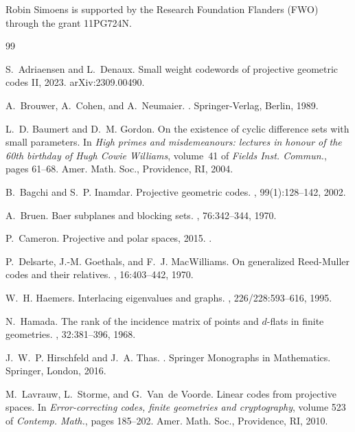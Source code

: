\documentclass[a4paper]{article}
\theoremstyle{definition}
\begin{document}
Robin Simoens is supported by the Research Foundation Flanders (FWO) through the grant 11PG724N.

\begin{thebibliography}{99}\setlength{\itemsep}{-1mm}

S.~Adriaensen and L.~Denaux.
\newblock Small weight codewords of projective geometric codes {II}, 2023.
\newblock arXiv:2309.00490.

A.~Brouwer, A.~Cohen, and A.~Neumaier.
.
\newblock Springer-Verlag, Berlin, 1989.

L.~D. Baumert and D.~M. Gordon.
\newblock On the existence of cyclic difference sets with small parameters.
\newblock In {\em High primes and misdemeanours: lectures in honour of the 60th
  birthday of {H}ugh {C}owie {W}illiams}, volume~41 of {\em Fields Inst.
  Commun.}, pages 61--68. Amer. Math. Soc., Providence, RI, 2004.

B.~Bagchi and S.~P. Inamdar.
\newblock Projective geometric codes.
, 99(1):128--142, 2002.

A.~Bruen.
\newblock Baer subplanes and blocking sets.
, 76:342--344,
  1970.

P.~Cameron.
\newblock Projective and polar spaces, 2015.
.

P.~Delsarte, J.-M. Goethals, and F.~J. MacWilliams.
\newblock On generalized {R}eed-{M}uller codes and their relatives.
, 16:403--442, 1970.

W.~H. Haemers.
\newblock Interlacing eigenvalues and graphs.
, 226/228:593--616, 1995.

N.~Hamada.
\newblock The rank of the incidence matrix of points and {$d$}-flats in finite
  geometries.
, 32:381--396, 1968.

J.~W.~P. Hirschfeld and J.~A. Thas.
.
\newblock Springer Monographs in Mathematics. Springer, London, 2016.

M.~Lavrauw, L.~Storme, and G.~Van~de Voorde.
\newblock Linear codes from projective spaces.
\newblock In {\em Error-correcting codes, finite geometries and cryptography},
  volume 523 of {\em Contemp. Math.}, pages 185--202. Amer. Math. Soc.,
  Providence, RI, 2010.


\end{thebibliography}
\end{document}
